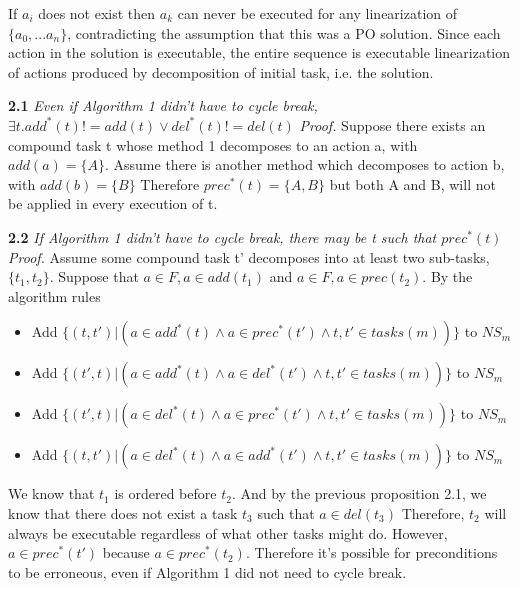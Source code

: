 	If $a_i$ does not exist then $a_k$ can never be executed for any linearization of $\{a_0, ...a_n\}$, contradicting the assumption that this was a PO solution. Since each action in the solution is executable, the entire sequence is executable linearization of actions produced by decomposition of initial task, i.e. the solution.
	

\textbf{2.1} \textit{Even if Algorithm 1 didn't have to cycle break, $\exists t. add^{*}(t) != add(t) \lor del^{*}(t) != del(t) $ }\newline
\textit{Proof.}
Suppose there exists an compound task t whose method 1 decomposes to an action a, with $add(a) = \{A\}$.
Assume there is another method which decomposes to action b, with $add(b) = \{B\}$
Therefore $prec^{*}(t) =\{A, B\} $ but both A and B, will not be applied in every execution of t.


\textbf{2.2} \textit{If Algorithm 1 didn't have to cycle break, there may be t such that $prec^{*}(t)$ } \newline
\textit{Proof.}
Assume some compound task t' decomposes into at least two sub-tasks, $\{t_1, t_2\}$. Suppose that $a \in F, a \in add(t_1)$ and
$a \in F, a \in prec(t_2)$. By the algorithm rules
\begin{itemize}			
		\item Add $\{ (t, t') |  (a \in add^{*}(t) \land a \in prec^{*}(t') \land t, t' \in tasks(m) ) \}$ to $NS_m$ 
		\item Add $\{ (t', t) |  (a \in add^{*}(t) \land a \in del^{*}(t') \land t, t' \in tasks(m) ) \}$ to $NS_m$ 
		\item Add $\{ (t', t) |  (a \in del^{*}(t) \land a \in prec^{*}(t') \land t, t' \in tasks(m) ) \}$ to $NS_m$ 
		\item Add $\{ (t, t') |  (a \in del^{*}(t) \land a \in add^{*}(t') \land t, t' \in tasks(m) ) \}$ to $NS_m$ 
\end{itemize}	
We know that $t_1$ is ordered before $t_2$. And by the previous proposition 2.1, we know that there does not exist a task $t_3$
such that $a \in del(t_3)$ Therefore, $t_2$ will always be executable regardless of what other tasks might do. However, $a \in prec^{*}(t')$ because $a \in prec^{*}(t_2)$. 
Therefore it's possible for preconditions to be erroneous, even if Algorithm 1 did not need to cycle break.

